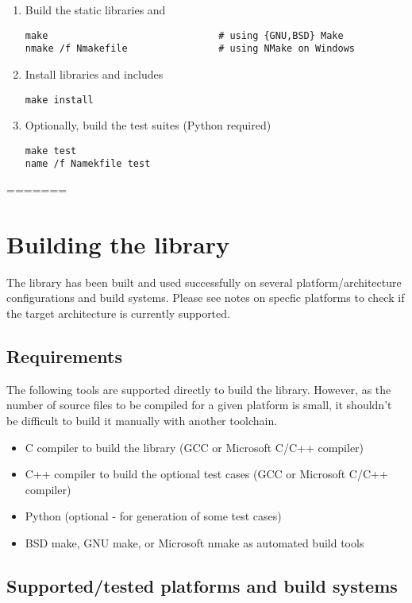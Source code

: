 \begin{enumerate}
\item Build the static libraries  and 
\begin{lstlisting}
make                              # using {GNU,BSD} Make
nmake /f Nmakefile                # using NMake on Windows
\end{lstlisting}
\item Install libraries and includes
\begin{lstlisting}
make install 
\end{lstlisting}
\item Optionally, build the test suites (Python required)
\begin{lstlisting}
make test
name /f Namekfile test
\end{lstlisting}
\end{enumerate}

=======
\newpage
\section{Building the library}

The library has been built and used successfully on several 
platform/architecture configurations and build systems.
Please see notes on specfic platforms to check if the target
architecture is currently supported.


\subsection{Requirements}

The following tools are supported directly to build the  library.
However, as the number of source files to be compiled for a given
platform is small, it shouldn't be difficult to build it manually with
another toolchain.
\begin{itemize}
\item C compiler to build the  library (GCC or Microsoft C/C++ compiler)
\item C++ compiler to build the optional test cases (GCC or Microsoft C/C++ compiler)
\item Python (optional - for generation of some test cases)
\item BSD make, GNU make, or Microsoft nmake as automated build tools
\end{itemize}


\subsection{Supported/tested platforms and build systems}

